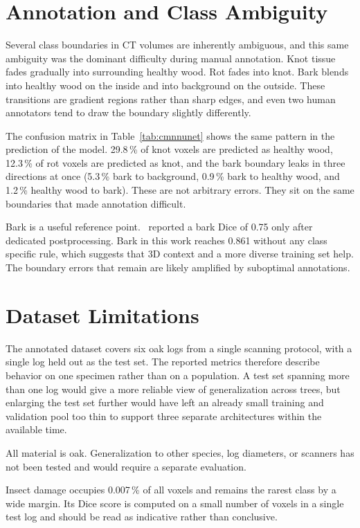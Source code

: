 \section{Annotation and Class Ambiguity}

Several class boundaries in CT volumes are inherently ambiguous, and this same ambiguity was the dominant difficulty during manual annotation. Knot tissue fades gradually into surrounding healthy wood. Rot fades into knot. Bark blends into healthy wood on the inside and into background on the outside. These transitions are gradient regions rather than sharp edges, and even two human annotators tend to draw the boundary slightly differently.

The confusion matrix in Table~\ref{tab:cmnnunet} shows the same pattern in the prediction of the model. 29.8\,\% of knot voxels are predicted as healthy wood, 12.3\,\% of rot voxels are predicted as knot, and the bark boundary leaks in three directions at once (5.3\,\% bark to background, 0.9\,\% bark to healthy wood, and 1.2\,\% healthy wood to bark). These are not arbitrary errors. They sit on the same boundaries that made annotation difficult.

Bark is a useful reference point.~\cite{gergel2026wood} reported a bark Dice of 0.75 only after dedicated postprocessing. Bark in this work reaches 0.861 without any class specific rule, which suggests that 3D context and a more diverse training set help. The boundary errors that remain are likely amplified by suboptimal annotations.

\section{Dataset Limitations}

The annotated dataset covers six oak logs from a single scanning protocol, with a single log held out as the test set. The reported metrics therefore describe behavior on one specimen rather than on a population. A test set spanning more than one log would give a more reliable view of generalization across trees, but enlarging the test set further would have left an already small training and validation pool too thin to support three separate architectures within the available time.

All material is oak. Generalization to other species, log diameters, or scanners has not been tested and would require a separate evaluation.

Insect damage occupies 0.007\,\% of all voxels and remains the rarest class by a wide margin. Its Dice score is computed on a small number of voxels in a single test log and should be read as indicative rather than conclusive.

